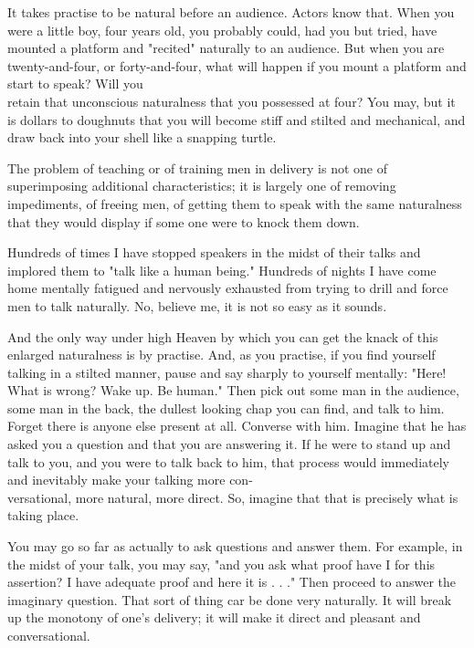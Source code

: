 \documentclass[10pt]{article}
\begin{document}
It takes practise to be natural before an audience. Actors know that. When you were a little boy, four years old, you probably could, had you but tried, have mounted a platform and "recited" naturally to an audience. But when you are twenty-and-four, or forty-and-four, what will happen if you mount a platform and start to speak? Will you\\
retain that unconscious naturalness that you possessed at four? You may, but it is dollars to doughnuts that you will become stiff and stilted and mechanical, and draw back into your shell like a snapping turtle.

The problem of teaching or of training men in delivery is not one of superimposing additional characteristics; it is largely one of removing impediments, of freeing men, of getting them to speak with the same naturalness that they would display if some one were to knock them down.

Hundreds of times I have stopped speakers in the midst of their talks and implored them to "talk like a human being." Hundreds of nights I have come home mentally fatigued and nervously exhausted from trying to drill and force men to talk naturally. No, believe me, it is not so easy as it sounds.

And the only way under high Heaven by which you can get the knack of this enlarged naturalness is by practise. And, as you practise, if you find yourself talking in a stilted manner, pause and say sharply to yourself mentally: "Here! What is wrong? Wake up. Be human." Then pick out some man in the audience, some man in the back, the dullest looking chap you can find, and talk to him. Forget there is anyone else present at all. Converse with him. Imagine that he has asked you a question and that you are answering it. If he were to stand up and talk to you, and you were to talk back to him, that process would immediately and inevitably make your talking more con-\\
versational, more natural, more direct. So, imagine that that is precisely what is taking place.

You may go so far as actually to ask questions and answer them. For example, in the midst of your talk, you may say, "and you ask what proof have I for this assertion? I have adequate proof and here it is . . ." Then proceed to answer the imaginary question. That sort of thing car be done very naturally. It will break up the monotony of one's delivery; it will make it direct and pleasant and conversational.
\end{document}
